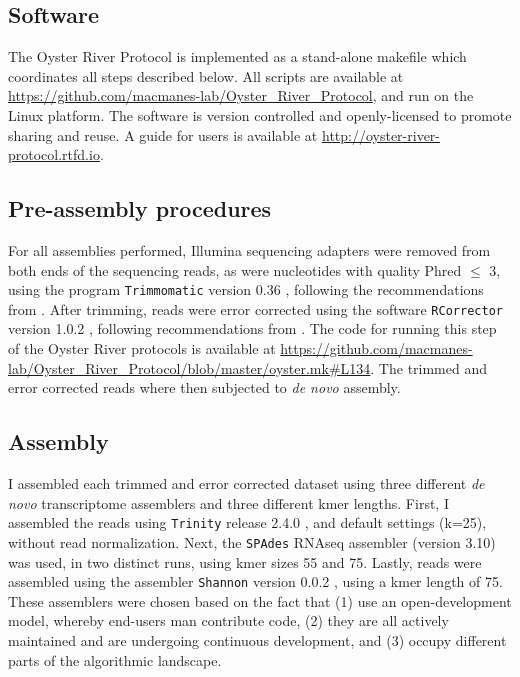 \documentclass[10pt,letterpaper]{article}
\begin{document}
\subsection{Software}

The Oyster River Protocol is implemented as a stand-alone makefile which coordinates all steps described below. All scripts are available at \url{https://github.com/macmanes-lab/Oyster_River_Protocol}, and run on the Linux platform. The software is version controlled and openly-licensed to promote sharing and reuse. A guide for users is available at \url{http://oyster-river-protocol.rtfd.io}.


\subsection{Pre-assembly procedures}

For all assemblies performed, Illumina sequencing adapters were removed from both ends of the sequencing reads, as were nucleotides with quality Phred $\leq$ 3, using the program \texttt{Trimmomatic} version 0.36 \cite{Bolger:2014ek}, following the recommendations from \cite{MacManes:2014io}. After trimming, reads were error corrected using the software \texttt{RCorrector} version 1.0.2 \cite{Song:2015in}, following recommendations from \cite{MacManes:2013ec}. The code for running this step of the Oyster River protocols is available at \url{https://github.com/macmanes-lab/Oyster_River_Protocol/blob/master/oyster.mk#L134}. The trimmed and error corrected reads where then subjected to \textit{de novo} assembly. 


\subsection{Assembly}

I assembled each trimmed and error corrected dataset using three different \textit{de novo} transcriptome assemblers and three different kmer lengths. First, I assembled the reads using \texttt{Trinity} release 2.4.0 \citep{Haas:2013jq}, and default settings (k=25), without read normalization. Next, the \texttt{SPAdes} RNAseq assembler (version 3.10) \cite{Chikhi:2013ep} was used, in two distinct runs, using kmer sizes 55 and 75. Lastly, reads were assembled using the assembler \texttt{Shannon} version 0.0.2 \cite{Kannan:2016be}, using a kmer length of 75. These assemblers were chosen based on the fact that (1) use an open-development model, whereby end-users man contribute code, (2) they are all actively maintained and are undergoing continuous development, and (3) occupy different parts of the algorithmic landscape. 
\end{document}
